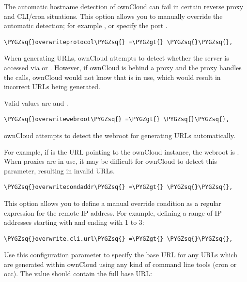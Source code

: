 \documentclass[letterpaper,10pt,english]{sphinxmanual}
\def\PYGZgt{\char`\>}
\def\PYGZsq{\char`\'}
\renewcommand\PYGZsq{\textquotesingle}
\begin{document}
The automatic hostname detection of ownCloud can fail in certain reverse
proxy and CLI/cron situations. This option allows you to manually override
the automatic detection; for example , or specify the port
.

\begin{Verbatim}[commandchars=\\\{\}]
\PYGZsq{}overwriteprotocol\PYGZsq{} =\PYGZgt{} \PYGZsq{}\PYGZsq{},
\end{Verbatim}

When generating URLs, ownCloud attempts to detect whether the server is
accessed via  or . However, if ownCloud is behind a proxy
and the proxy handles the  calls, ownCloud would not know that
 is in use, which would result in incorrect URLs being generated.

Valid values are  and .

\begin{Verbatim}[commandchars=\\\{\}]
\PYGZsq{}overwritewebroot\PYGZsq{} =\PYGZgt{} \PYGZsq{}\PYGZsq{},
\end{Verbatim}

ownCloud attempts to detect the webroot for generating URLs automatically.

For example, if  is the URL pointing to the
ownCloud instance, the webroot is . When proxies are in use, it
may be difficult for ownCloud to detect this parameter, resulting in invalid
URLs.

\begin{Verbatim}[commandchars=\\\{\}]
\PYGZsq{}overwritecondaddr\PYGZsq{} =\PYGZgt{} \PYGZsq{}\PYGZsq{},
\end{Verbatim}

This option allows you to define a manual override condition as a regular
expression for the remote IP address. For example, defining a range of IP
addresses starting with  and ending with 1 to 3:

\begin{Verbatim}[commandchars=\\\{\}]
\PYGZsq{}overwrite.cli.url\PYGZsq{} =\PYGZgt{} \PYGZsq{}\PYGZsq{},
\end{Verbatim}

Use this configuration parameter to specify the base URL for any URLs which
are generated within ownCloud using any kind of command line tools (cron or
occ). The value should contain the full base URL:
\end{document}
